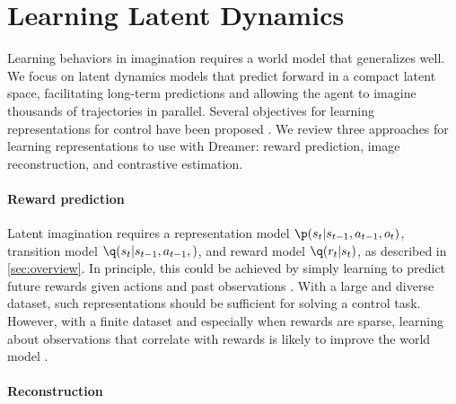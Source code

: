 \vspace*{-.8ex}
\section{Learning Latent Dynamics}
\label{sec:dynamics}
\vspace*{-.8ex}





Learning behaviors in imagination requires a world model that generalizes well. We focus on latent dynamics models that predict forward in a compact latent space, facilitating long-term predictions and allowing the agent to imagine thousands of trajectories in parallel. Several objectives for learning representations for control have been proposed \citep{watter2015e2c,jaderberg2016unreal,oord2018cpc,eslami2018gqn}. We review three approaches for learning representations to use with Dreamer: reward prediction, image reconstruction, and contrastive estimation.

\paragraph{Reward prediction}

Latent imagination requires a representation model $\p(s_t|s_{t-1},a_{t-1},o_t)$, transition model $\q(s_t|s_{t-1},a_{t-1},)$, and reward model $\q(r_t|s_t)$, as described in \cref{sec:overview}. In principle, this could be achieved by simply learning to predict future rewards given actions and past observations \citep{oh2017vpn,gelada2019deepmdp,schrittwieser2019muzero}. With a large and diverse dataset, such representations should be sufficient for solving a control task. However, with a finite dataset and especially when rewards are sparse, learning about observations that correlate with rewards is likely to improve the world model \citep{jaderberg2016unreal,gregor2019beliefstate}.

\pagebreak

\paragraph{Reconstruction}


